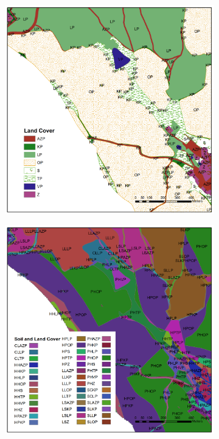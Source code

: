 \begin{figure}[t!]
\begin{subfigure}[b]{0.4\linewidth}
    \caption{\label{fig:puda}}
  \end{subfigure}\\
  \begin{subfigure}[b]{0.4\linewidth}
    \centering\includegraphics[width=1\linewidth]{./img/LandCover.png}
    \caption{\label{fig:LU}}
  \end{subfigure}%
  \begin{subfigure}[b]{0.4\linewidth}
    \centering\includegraphics[width=1\linewidth]{./img/SoilAndLC.png}

\end{subfigure}
\end{figure}
